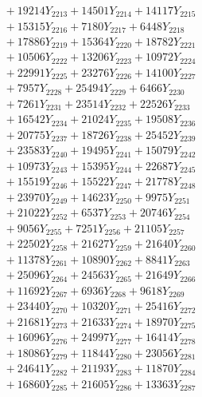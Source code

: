 \documentclass[a4paper,10pt]{article}
\begin{document}
{\begin{align}
&\;  + 19214 Y_{2213} + 14501 Y_{2214} + 14117 Y_{2215} \\[0.3ex]
&\;  + 15315 Y_{2216} + 7180 Y_{2217} + 6448 Y_{2218} \\[0.5ex]\allowbreak
&\;  + 17886 Y_{2219} + 15364 Y_{2220} + 18782 Y_{2221} \\[0.3ex]
&\;  + 10506 Y_{2222} + 13206 Y_{2223} + 10972 Y_{2224} \\[0.3ex]
&\;  + 22991 Y_{2225} + 23276 Y_{2226} + 14100 Y_{2227} \\[0.3ex]
&\;  + 7957 Y_{2228} + 25494 Y_{2229} + 6466 Y_{2230} \\[0.3ex]
&\;  + 7261 Y_{2231} + 23514 Y_{2232} + 22526 Y_{2233} \\[0.3ex]
&\;  + 16542 Y_{2234} + 21024 Y_{2235} + 19508 Y_{2236} \\[0.3ex]
&\;  + 20775 Y_{2237} + 18726 Y_{2238} + 25452 Y_{2239} \\[0.3ex]
&\;  + 23583 Y_{2240} + 19495 Y_{2241} + 15079 Y_{2242} \\[0.3ex]
&\;  + 10973 Y_{2243} + 15395 Y_{2244} + 22687 Y_{2245} \\[0.3ex]
&\;  + 15519 Y_{2246} + 15522 Y_{2247} + 21778 Y_{2248} \\[0.5ex]\allowbreak
&\;  + 23970 Y_{2249} + 14623 Y_{2250} + 9975 Y_{2251} \\[0.3ex]
&\;  + 21022 Y_{2252} + 6537 Y_{2253} + 20746 Y_{2254} \\[0.3ex]
&\;  + 9056 Y_{2255} + 7251 Y_{2256} + 21105 Y_{2257} \\[0.3ex]
&\;  + 22502 Y_{2258} + 21627 Y_{2259} + 21640 Y_{2260} \\[0.3ex]
&\;  + 11378 Y_{2261} + 10890 Y_{2262} + 8841 Y_{2263} \\[0.3ex]
&\;  + 25096 Y_{2264} + 24563 Y_{2265} + 21649 Y_{2266} \\[0.3ex]
&\;  + 11692 Y_{2267} + 6936 Y_{2268} + 9618 Y_{2269} \\[0.3ex]
&\;  + 23440 Y_{2270} + 10320 Y_{2271} + 25416 Y_{2272} \\[0.3ex]
&\;  + 21681 Y_{2273} + 21633 Y_{2274} + 18970 Y_{2275} \\[0.3ex]
&\;  + 16096 Y_{2276} + 24997 Y_{2277} + 16414 Y_{2278} \\[0.5ex]\allowbreak
&\;  + 18086 Y_{2279} + 11844 Y_{2280} + 23056 Y_{2281} \\[0.3ex]
&\;  + 24641 Y_{2282} + 21193 Y_{2283} + 11870 Y_{2284} \\[0.3ex]
&\;  + 16860 Y_{2285} + 21605 Y_{2286} + 13363 Y_{2287} \\[0.3ex]

\end{align}}
\end{document}
